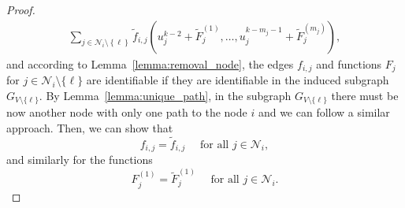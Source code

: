 \documentclass[10pt,a4paper]{amsart}
\newcommand{\NN}{\mathcal{N}}
\newcommand{\brc}[1]{\left\{#1\right\}}
\begin{document}
\begin{proof}
\begin{multline}
\sum_{j\in\NN_i\setminus\brc{\ell}}\tilde f_{i,j}(u_{j}^{k-2}+\tilde F_{j}^{(1)},\ldots,u_{j}^{k-m_{j}-1}+\tilde F_{j}^{(m_{j})}),
\end{multline}
and according to Lemma~\ref{lemma:removal_node}, the edges $f_{i,j}$ and functions $F_j$ for $j\in\NN_i\setminus\{\ell\}$ are identifiable if they are identifiable in the induced subgraph $G_{V\setminus\{ \ell\}}$.
By Lemma~\ref{lemma:unique_path}, in the subgraph $G_{V\setminus\{ \ell\}}$ there must be now another node with only one path to the node $i$ and we can follow a similar approach. Then, we can show that 
$$
f_{i,j}=\tilde f_{i,j} \quad \text{ for all } j\in\NN_i,
$$
and similarly for the functions
$$
F_j^{(1)}=\tilde F_j^{(1)} \quad \text{ for all } j\in\NN_i.
$$
\end{proof}
\end{document}
